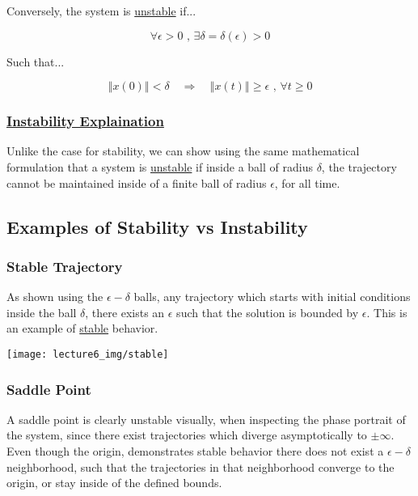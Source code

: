 Conversely, the system is \underline{unstable} if...

$$
\forall \epsilon > 0 \text{ , } \exists \delta = \delta(\epsilon) > 0
$$

\noindent Such that...

$$
\left\Vert x(0)\right\Vert < \delta \quad \Rightarrow \quad \left\Vert x(t)\right\Vert \geq \epsilon \text{ , } \forall t \geq 0
$$


\subsubsection*{\underline{Instability Explaination}}

Unlike the case for stability, we can show using the same mathematical formulation that a system is \underline{unstable} if inside a ball of radius $\delta$, the trajectory cannot be maintained inside of a finite ball of radius $\epsilon$, for all time.


\subsection*{Examples of Stability vs Instability}

\subsubsection*{Stable Trajectory}
As shown using the $\epsilon-\delta$ balls, any trajectory which starts with initial conditions inside the ball $\delta$, there exists an $\epsilon$ such that the solution is bounded by $\epsilon$. This is an example of \underline{stable} behavior.


\begin{center}
  \texttt{[image: lecture6\_img/stable]}
\end{center}

\subsubsection*{Saddle Point}

A saddle point is clearly unstable visually, when inspecting the phase portrait of the system, since there exist trajectories which diverge asymptotically to $\pm \infty$. Even though the origin, demonstrates stable behavior there does not exist a $\epsilon-\delta$ neighborhood, such that the trajectories in that neighborhood converge to the origin, or stay inside of the defined bounds. \\

